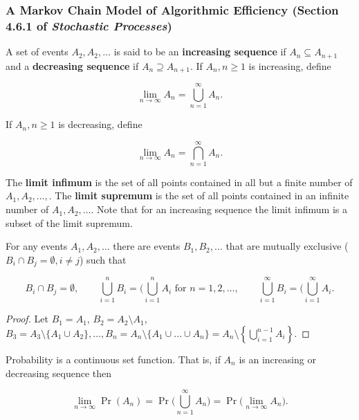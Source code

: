 \subsubsection{A Markov Chain Model of Algorithmic Efficiency (Section 4.6.1 of \textit{Stochastic Processes})}

\begin{definition}

A set of events \(A_2, A_2, \ldots\) is said to be an \textbf{increasing sequence} if \(A_n \subseteq A_{n+1}\) and a \textbf{decreasing sequence} if \(A_n \supseteq A_{n+1}\). If \(A_n, n \geq 1 \) is increasing, define

\[
\lim_{n \to \infty} A_n = \bigcup_{n=1}^\infty A_n.
\]

If \(A_n, n \geq 1 \) is decreasing, define

\[
\lim_{n \to \infty} A_n = \bigcap_{n=1}^\infty A_n.
\]

The \textbf{limit infimum} is the set of all points contained in all but a finite number of \(A_1, A_2, \ldots,\). The \textbf{limit supremum} is the set of all points contained in an infinite number of \(A_1, A_2, \ldots\). Note that for an increasing sequence the limit infimum is a subset of the limit supremum.

\end{definition}

\begin{lemma}\label{stoch.ross.inclass.simp.lemma}For any events \(A_1, A_2, \ldots\) there are events \(B_1, B_2, \ldots\) that are mutually exclusive (\(B_i \cap B_j = \emptyset, i \neq j\)) such that 

\[
 B_i \cap B_j = \emptyset, \qquad   \bigcup_{i=1}^n B_i = (\bigcup_{i=1}^n A_i \text{ for } n = 1, 2, \ldots , \qquad \bigcup_{i=1}^\infty B_i = (\bigcup_{i=1}^\infty A_i . 
\]

\end{lemma}

\begin{proof}
Let \(B_1 = A_1\), \(B_2 = A_2 \setminus A_1\), \(B_3 = A_3 \setminus \{A_1 \cup A_2\}, \ldots, B_n = A_n \setminus \{A_1 \cup \ldots \cup A_n\} = A_n \setminus \left\{  \bigcup_{i=1}^{n-1} A_i \right\}\).
\end{proof}

\begin{theorem}\label{stoch.prob.set.func}Probability is a continuous set function. That is, if \(A_n\) is an increasing or decreasing sequence then

\[
\lim_{n \to \infty} \Pr(A_n) = \Pr \bigg( \bigcup_{n=1}^\infty A_n \bigg) = \Pr \Big(\lim_{n \to \infty} A_n \Big).
\]

\end{theorem}

